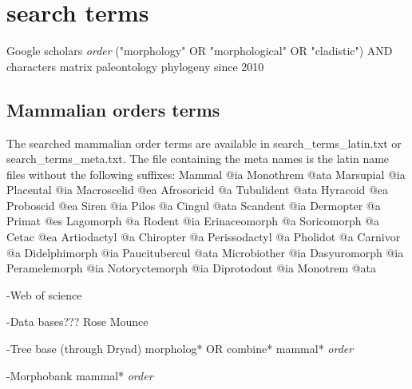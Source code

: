 \documentclass[a4paper,11pt]{article}
\begin{document}
\section{search terms}

Google scholars
\textit{order} ("morphology" OR "morphological" OR "cladistic") AND characters matrix paleontology phylogeny
since 2010

\subsection{Mammalian orders terms}
The searched mammalian order terms are available in search_terms_latin.txt or search_terms_meta.txt. The file containing the meta names is the latin name files without the following suffixes: Mammal     @ia
Monothrem     @ata
Marsupial     @ia
Placental     @ia
Macroscelid     @ea
Afrosoricid     @a
Tubulident     @ata
Hyracoid     @ea
Proboscid     @ea
Siren     @ia
Pilos     @a
Cingul     @ata
Scandent     @ia
Dermopter     @a
Primat     @es
Lagomorph     @a
Rodent     @ia
Erinaceomorph     @a
Soricomorph     @a
Cetac     @ea
Artiodactyl     @a
Chiropter     @a
Perissodactyl     @a
Pholidot     @a
Carnivor     @a
Didelphimorph     @ia
Paucitubercul     @ata
Microbiother     @ia
Dasyuromorph     @ia
Peramelemorph     @ia
Notoryctemorph     @ia
Diprotodont     @ia
Monotrem     @ata


-Web of science


-Data bases???
Rose Mounce

-Tree base (through Dryad)
morpholog* OR combine*
mammal*
\textit{order}


-Morphobank
mammal*
\textit{order}


\end{document}
